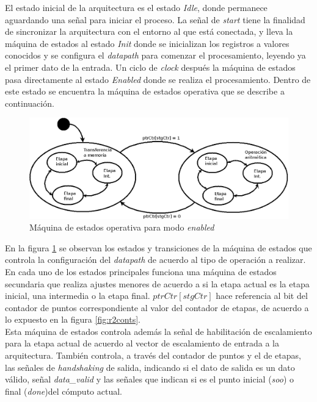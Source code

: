 El estado inicial de la arquitectura es el estado
\textit{Idle}, donde permanece aguardando una señal para iniciar el proceso. La señal de
\textit{start} tiene la finalidad de sincronizar la arquitectura con el entorno al que está conectada, y lleva la
máquina de estados al estado \textit{Init} donde se inicializan los registros a valores conocidos y
se configura el \textit{datapath} para comenzar el procesamiento, leyendo ya el primer dato de la
entrada. Un ciclo de \textit{clock} después la máquina de estados pasa directamente al estado \textit{Enabled} 
donde se realiza el procesamiento. Dentro de
este estado se encuentra la máquina de estados operativa que se describe a continuación.

\begin{figure}[htb!]
        \centering
        \includegraphics[width=13cm]{./figures/SMr2op.png}
        \caption{Máquina de estados operativa para modo \textit{enabled}}
        \label{fig:opSMr2}
\end{figure}

En la figura \ref{fig:opSMr2} se observan los estados y transiciones de la máquina de estados
que controla la configuración del \textit{datapath} de acuerdo al tipo de operación a
realizar.
En cada uno de los estados principales funciona una máquina de estados secundaria que realiza
ajustes menores de acuerdo a si la etapa actual es la etapa inicial, una intermedia o la etapa final. $ptrCtr[stgCtr]$ hace
referencia al bit del contador de puntos correspondiente al valor del contador de etapas, de
acuerdo a lo expuesto en la figura \ref{fig:r2conts}.\\
Esta máquina de estados controla además la señal de habilitación de escalamiento para la etapa
actual de acuerdo al vector de escalamiento de entrada a la arquitectura. También controla, a través
del contador de puntos y el de etapas, las señales de \textit{handshaking} de salida, indicando si
el dato de salida es un dato válido, señal \textit{data\_valid} y las señales que indican si es el
punto inicial (\textit{soo}) o final (\textit{done})del cómputo actual.


